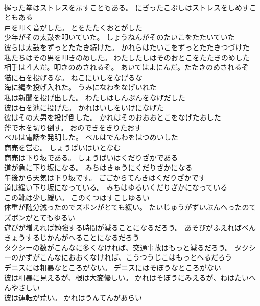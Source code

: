 \documentclass[8pt]{extreport}
\begin{document}
\begin{CJK}{UTF8}{min}
\\	握った拳はストレスを示すこともある。	にぎったこぶしはストレスをしめすこともある 
\\	戸を叩く音がした。	とをたたくおとがした 
\\	少年がその太鼓を叩いていた。	しょうねんがそのたいこをたたいていた 
\\	彼らは太鼓をずっとたたき続けた。	かれらはたいこをずっとたたきつづけた 
\\	私たちはその男を叩きのめした。	わたしたしはそのおとこをたたきのめした 
\\	相手は４人だ。叩きのめされるぞ。	あいてはよにんだ。たたきのめされるぞ 
\\	猫に石を投げるな。	ねこにいしをなげるな 
\\	海に縄を投げ入れた。	うみになわをなげいれた 
\\	私は新聞を投げ出した。	わたしはしんぶんをなげだした 
\\	彼は石を池に投げた。	かれはいしをいけになげた 
\\	彼はその大男を投げ倒した。	かれはそのおおおとこをなげたおした 
\\	斧で木を切り倒す。	おのできをきりたおす 
\\	ベルは電話を発明した。	ベルはでんわをはつめいした 
\\	商売を営む。	しょうばいはいとなむ 
\\	商売は下り坂である。	しょうばいはくだりざかである 
\\	道が急に下り坂になる。	みちはきゅうにくだりざかになる 
\\	午後から天気は下り坂です。	ごごからてんきはくだりざかです 
\\	道は緩い下り坂になっている。	みちはゆるいくだりざかになっている 
\\	この靴は少し緩い。	このくつはすこしゆるい 
\\	体重が随分減ったのでズボンがとても緩い。	たいじゅうがずいぶんへったのてズボンがとてもゆるい 
\\	遊びが増えれば勉強する時間が減ることになるだろう。	あそびがふえればべんきょうするじかんがへることになるだろう 
\\	タクシーの数がこんなに多くなければ、交通事故はもっと減るだろう。	タクシーのかずがこんなにおおくなければ、こうつうじこはもっとへるだろう 
\\	デニスには粗暴なところがない。	デニスにはそぼうなところがない 
\\	彼は粗暴に見えるが、根は大変優しい。	かれはそぼうにみえるが、ねはたいへんやさしい 
\\	彼は運転が荒い。	かれはうんてんがあらい 

\end{CJK}
\end{document}
